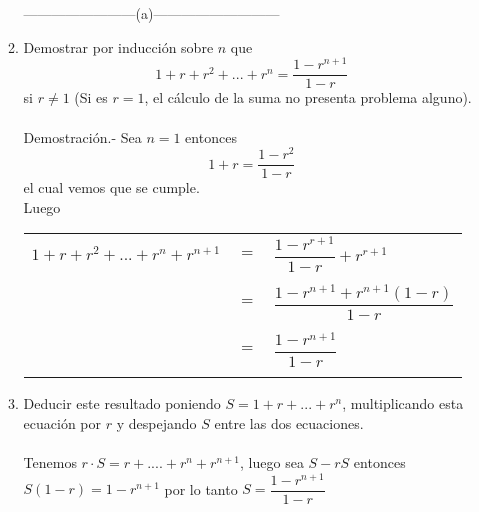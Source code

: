 \begin{enumerate}
\begin{enumerate}[\bfseries (a)]
     ------------------------(a)---------------------------
      \item Demostrar por inducción sobre $n$ que $$1 + r +r^2 + ... + r^n = \dfrac{1 - r^{n+1}}{1-r}$$ si $r\neq 1$ (Si es $r=1$, el cálculo de la suma no presenta problema alguno).\\\\
      Demostración.- \; Sea $n=1$ entonces $$1+r = \dfrac{1- r^2}{1-r}$$ el cual vemos que se cumple.\\
      Luego
      \begin{center}
      \begin{tabular}{r c l}
      $1+r+r^2 + ... + r^n + r^{n+1}$&$=$&$\dfrac{1- r^{r+1}}{1-r} + r^{r+1}$\\\\
      &$=$&$\dfrac{1 - r^{n+1} + r^{n+1} (1-r)}{1-r}$\\\\
      &$=$&$\dfrac{1 - r^{n+1}}{1-r}$\\\\
      \end{tabular}
      \end{center} 

      \item Deducir este resultado poniendo $S=1+r+...+r^n$, multiplicando esta ecuación por $r$ y despejando $S$ entre las dos ecuaciones.\\\\
      Tenemos $r\cdot S = r + .... + r^n + r^{n+1}$, luego sea $S - rS$ entonces $S(1-r) = 1-r^{n+1}$ por lo tanto $S = \dfrac{1-r^{n+1}}{1-r}$\\\\
      \end{enumerate}


\end{enumerate}
